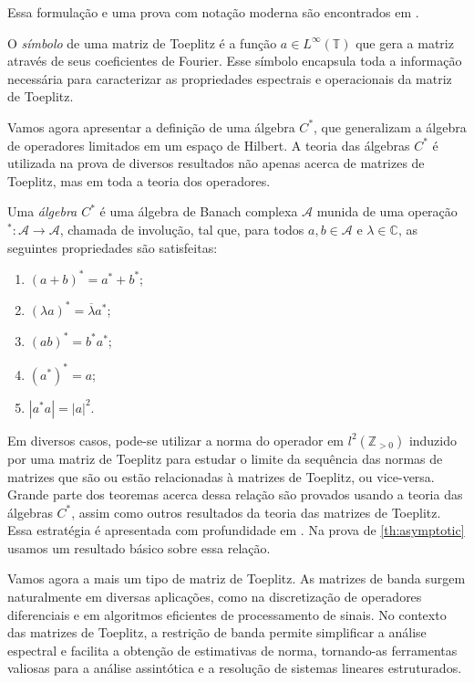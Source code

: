 Essa formulação e uma prova com notação moderna são encontrados em \cite[p. 1]{bottcher}.

O \textit{símbolo} de uma matriz de Toeplitz é a função $a \in L^\infty(\mathbb{T})$ que gera a matriz através de seus coeficientes de Fourier. Esse símbolo encapsula toda a informação necessária para caracterizar as propriedades espectrais e operacionais da matriz de Toeplitz.

Vamos agora apresentar a definição de uma álgebra $C^\ast$, que generalizam a álgebra de operadores limitados em um espaço de Hilbert. A teoria das álgebras $C^\ast$ é utilizada na prova de diversos resultados não apenas acerca de matrizes de Toeplitz, mas em toda a teoria dos operadores.

\begin{definition*}
  Uma \textit{álgebra $C^\ast$} é uma álgebra de Banach complexa $\mathcal{A}$ munida de uma operação $^\ast : \mathcal{A} \to \mathcal{A}$, chamada de involução, tal que, para todos $a, b \in \mathcal{A}$ e $\lambda \in \mathbb{C}$, as seguintes propriedades são satisfeitas:
  \begin{enumerate}
    \item $(a + b)^\ast = a^\ast + b^\ast$;
    \item $(\lambda a)^\ast = \overline{\lambda} a^\ast$;
    \item $(ab)^\ast = b^\ast a^\ast$;
    \item $(a^\ast)^\ast = a$;
    \item $|a^\ast a| = |a|^2$.
  \end{enumerate}
\end{definition*}

Em diversos casos, pode-se utilizar a norma do operador em $l^2(\mathbb{Z}_{> 0})$ induzido por uma matriz de Toeplitz para estudar o limite da sequência das normas de matrizes que são ou estão relacionadas à matrizes de Toeplitz, ou vice-versa. Grande parte dos teoremas acerca dessa relação são provados usando a teoria das álgebras $C^\ast$, assim como outros resultados da teoria das matrizes de Toeplitz. Essa estratégia é apresentada com profundidade em \cite{bottcher}. Na prova de \ref{th:asymptotic} usamos um resultado básico sobre essa relação.

Vamos agora a mais um tipo de matriz de Toeplitz. As matrizes de banda surgem naturalmente em diversas aplicações, como na discretização de operadores diferenciais e em algoritmos eficientes de processamento de sinais. No contexto das matrizes de Toeplitz, a restrição de banda permite simplificar a análise espectral e facilita a obtenção de estimativas de norma, tornando-as ferramentas valiosas para a análise assintótica e a resolução de sistemas lineares estruturados.

